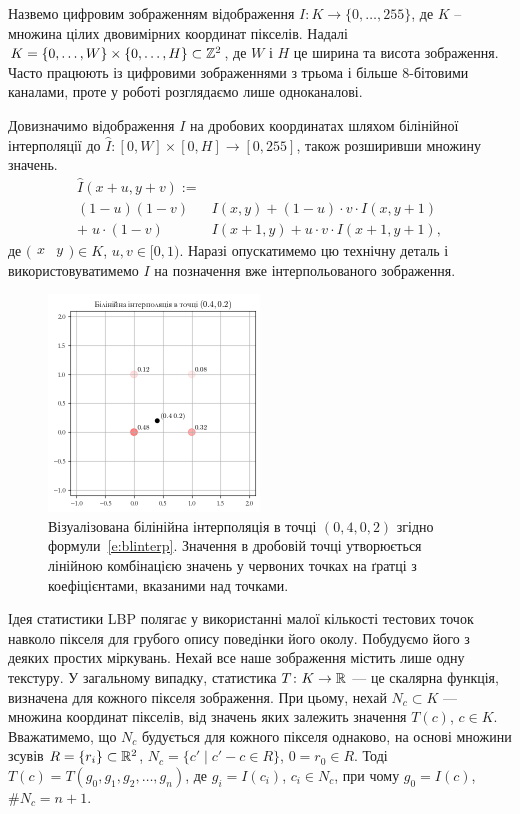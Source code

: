 Назвемо цифровим зображенням відображення 
$I \colon K \to \{0,\dots , 255\}$, де $K$ -- множина цілих двовимірних координат пікселів.
Надалі $K = \{0,\dots ,W\} \times \{0,\dots ,H\} \subset \mathbb Z^2$, 
де $W$ і $H$ це ширина та висота зображення.
Часто працюють із цифровими зображеннями з трьома і більше 8-бітовими каналами, проте у роботі розглядаємо лише одноканалові.

Довизначимо відображення $I$ на дробових координатах шляхом білінійної інтерполяції до $\hat I \colon [0,W] \times [0,H] \to [0,255]$, також розширивши множину значень.
\begin{equation}\label{e:blinterp}
\begin{split}
    \hat I(x+u,y+v) := \\
    (1 - u)(1 - v) & I(x,y) + (1-u) \cdot v \cdot I(x,y+1)\\ 
    + \; u \cdot (1-v) & I(x+1,y) + u \cdot v \cdot  I(x+1,y+1),
\end{split}
\end{equation}
де $\bigl(\begin{matrix} x & y \end{matrix}\bigr) \in K$, $u,v \in [0,1)$. 
Наразі опускатимемо цю технічну деталь і використовуватимемо $I$ на позначення вже інтерпольованого зображення.

\begin{figure}[h]
    \centering
    \includegraphics[width=0.5\textwidth]{img/bilinear-interpolation-1.png}
    \caption{
        Візуалізована білінійна інтерполяція в точці $(0{,}4,0{,}2)$ згідно формули~\eqref{e:blinterp}. 
        Значення в дробовій точці утворюється лінійною комбінацією значень у червоних точках на ґратці
        з коефіцієнтами, вказаними над точками.
    }
    \label{fig:bilinear-interp}
\end{figure}

Ідея статистики LBP \cite{ojala2002} полягає у використанні малої кількості тестових точок навколо пікселя для грубого опису поведінки його околу.
Побудуємо його з деяких простих міркувань.
Нехай все наше зображення містить лише одну текстуру.
У загальному випадку, статистика $T \colon K \to \mathbb R$ --- це скалярна функція, визначена для кожного пікселя зображення. 
При цьому, нехай $N_c \subset K$ --- множина координат пікселів, від значень яких залежить значення $T(c)$, $c \in K$. 
Вважатимемо, що $N_c$ будується для кожного пікселя однаково, на основі множини зсувів $R = \{r_i\} \subset \mathbb R^2$, $N_c = \{c' \mid c' - c \in R\}$, $0 = r_0 \in R$.
Тоді $T(c) = T(g_0, g_1, g_2, \dots, g_n)$, де $g_i = I(c_i)$, $c_i \in N_c$, при чому $g_0 = I(c)$, $\# N_c = n+1$.

